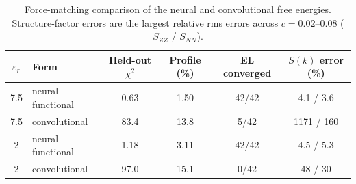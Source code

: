 \begin{table}[H]
\centering
\caption{Force-matching comparison of the neural and convolutional free energies. Structure-factor errors are the largest relative rms errors across $c=0.02$--0.08 ($S_{ZZ}$ / $S_{NN}$).}
\label{tab:S:dijkman}
\begin{tabular}{c l c c c c}
$\varepsilon_r$ & Form & Held-out $\chi^2$ & Profile (\%) & EL converged & $S(k)$ error (\%)\\
\midrule
7.5 & neural functional & 0.63 & 1.50 & 42/42 & 4.1 / 3.6\\
7.5 & convolutional & 83.4 & 13.8 & 5/42 & 1171 / 160\\
2 & neural functional & 1.18 & 3.11 & 42/42 & 4.5 / 5.3\\
2 & convolutional & 97.0 & 15.1 & 0/42 & 48 / 30\\
\bottomrule
\end{tabular}
\par\smallskip{}
\end{table}
